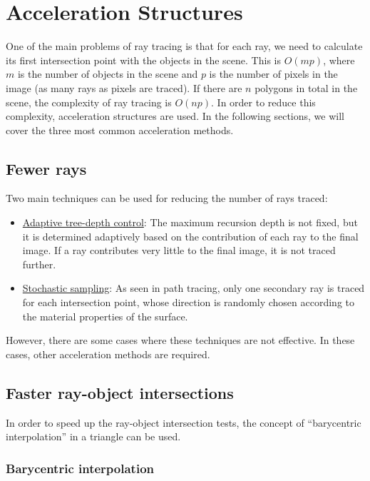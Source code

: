 \chapter{Acceleration Structures}

One of the main problems of ray tracing is that for each ray, we need to calculate its first intersection point with the objects in the scene. This is $O(mp)$, where $m$ is the number of objects in the scene and $p$ is the number of pixels in the image (as many rays as pixels are traced). If there are $n$ polygons in total in the scene, the complexity of ray tracing is $O(np)$. In order to reduce this complexity, acceleration structures are used. In the following sections, we will cover the three most common acceleration methods.

\section{Fewer rays}

Two main techniques can be used for reducing the number of rays traced:
\begin{itemize}
    \item \ul{Adaptive tree-depth control}: The maximum recursion depth is not fixed, but it is determined adaptively based on the contribution of each ray to the final image. If a ray contributes very little to the final image, it is not traced further.
    \item \ul{Stochastic sampling}: As seen in path tracing, only one secondary ray is traced for each intersection point, whose direction is randomly chosen according to the material properties of the surface.
\end{itemize}

However, there are some cases where these techniques are not effective. In these cases, other acceleration methods are required.


\section{Faster ray-object intersections}

In order to speed up the ray-object intersection tests, the concept of ``barycentric interpolation'' in a triangle can be used.

\subsection{Barycentric interpolation}


